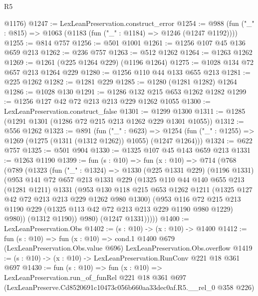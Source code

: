 \begin{lexlean}{R5}
\begin{coremodule}
      @1176)
@1247 := LexLeanPreservation.construct_error
@1254 := @988 (fun ("_" : @815) => @1063 (@1183 (fun ("_" : @1184) => @1246 (@1247 @1192))))
@1255 := @814 @757
@1256 := @501 @1001
@1261 := @1256 @107 @45 @136 @659 @213
@1262 := @236 @757
@1263 := @512 @1262
@1264 := @1263 @1262
@1269 := @1261 (@225 @1264 @229) (@1196 @1264)
@1275 := @1028 @134 @72 @657 @213 @1264 @229
@1280 := @1256 @110 @44 @133 @655 @213
@1281 := @225 @1262
@1282 := @1281 @229
@1285 := @1280 (@1281 @1282) @1264
@1286 := @1028 @130
@1291 := @1286 @132 @215 @653 @1262 @1282
@1299 := @1256 @127 @42 @72 @213 @213 @229 @1262 @1055
@1300 := LexLeanPreservation.construct_false
@1301 := @1299 @1300
@1311 := @1285 (@1291 @1301 (@1286 @72 @215 @213 @1262 @229 @1301 @1055))
@1312 := @556 @1262
@1323 := @891
    (fun ("_" : @623) =>
    @1254 (fun ("_" : @1255) => @1269 (@1275 (@1311 (@1312 @1262)) @1055) (@1247 @1264)))
@1324 := @622 @757
@1325 := @501 @904
@1330 := @1325 @107 @45 @143 @659 @213
@1331 := @1263 @1190
@1399 := fun (s : @10) =>
  fun (x : @10) =>
  @714
    (@768
      (@789
        (@1323
          (fun ("_" : @1324) =>
          @1330
            (@225 @1331 @229)
            (@1196 @1331)
            (@953
              @141
              @72
              @657
              @213
              @1331
              @229
              (@1325
                @110
                @44
                @140
                @655
                @213
                (@1281 @1211)
                @1331
                (@953
                  @130
                  @118
                  @215
                  @653
                  @1262
                  @1211
                  (@1325 @127 @42 @72 @213 @213 @229 @1262 @980 @1300)
                  (@953
                    @116
                    @72
                    @215
                    @213
                    @1190
                    @229
                    (@1325 @113 @42 @72 @213 @213 @229 @1190 @980 @1229)
                    @980))
                (@1312 @1190))
              @980)
            (@1247 @1331)))))
@1400 := LexLeanPreservation.Obs
@1402 := (s : @10) -> (x : @10) -> @1400
@1412 := fun (s : @10) =>
  fun (x : @10) =>
  cond.{1} @1400 @679 (LexLeanPreservation.Obs.value @696) LexLeanPreservation.Obs.overflow
@1419 := (s : @10) -> (x : @10) -> LexLeanPreservation.RunConv @221 @18 @361 @697
@1430 := fun (s : @10) =>
  fun (x : @10) =>
  LexLeanPreservation.run_of_funRel
    @221
    @18
    @361
    @697
    (LexLeanPreserve.Cd8520691c10473c056b660aa33dec0af.R5.__rel_0 @358 @226)
\end{coremodule}
\end{lexlean}
